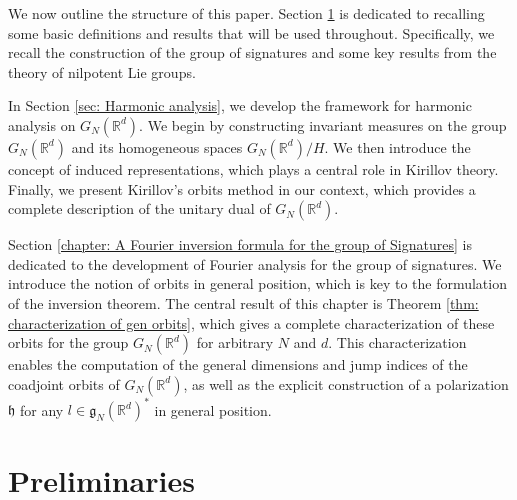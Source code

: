 \documentclass[pdflatex,sn-mathphys-num]{sn-jnl}
\theoremstyle{thmstyletwo}
\theoremstyle{thmstyleone}
\theoremstyle{thmstyletwo}
\newcommand{\fancyh}{\mathfrak{h}}
\newcommand{\fancyg}{\mathfrak{g}}
\newcommand{\R}{\mathbb{R}}
\begin{document}
    We now outline the structure of this paper. Section \ref{sec: preliminaries} is dedicated to recalling some basic definitions and results that will be used throughout. Specifically, we recall the construction of the group of signatures and some key results from the theory of nilpotent Lie groups.
	
	In Section \ref{sec: Harmonic analysis}, we develop the framework for harmonic analysis on $G_N(\R^d)$.  We begin by constructing invariant measures on the group $G_N(\R^d)$ and its homogeneous spaces $G_N(\R^d)/H$. We then introduce the concept of induced representations, which plays a central role in Kirillov theory. Finally, we present Kirillov's orbits method in our context, which provides a complete description of the unitary dual of $G_N(\R^d)$.
	
	Section \ref{chapter: A Fourier inversion formula for the group of Signatures} is dedicated to the development of Fourier analysis for the group of signatures. We introduce the notion of orbits in general position, which is key to the formulation of the inversion theorem. The central result of this chapter is Theorem \ref{thm: characterization of gen orbits}, which gives a complete characterization of these orbits for the group $G_N(\R^d)$ for arbitrary $N$ and $d$. This characterization enables the computation of the general dimensions and jump indices of the coadjoint orbits of $G_N(\R^d)$, as well as the explicit construction of a polarization $\fancyh$ for any $l \in \fancyg_N(\R^d)^*$ in general position.
	
	

\section{Preliminaries}\label{sec: preliminaries}
\end{document}

